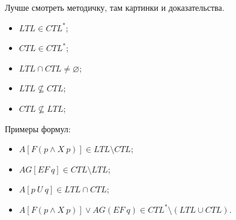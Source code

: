 \documentclass[a4paper,12pt]{article}
\begin{document}
Лучше смотреть методичку, там картинки и доказательства.
\begin{itemize}
    \item $LTL \in CTL^*$;
    \item $CTL \in CTL^*$;
    \item $LTL \cap CTL \ne \varnothing$;
    \item $LTL \nsubseteq CTL$;
    \item $CTL \nsubseteq LTL$;
\end{itemize}
Примеры формул:
\begin{itemize}
    \item $A[F(p \wedge X\ p)] \in LTL \setminus CTL$;
    \item $AG[EF\ q] \in CTL \setminus LTL$;
    \item $A[p\ U\ q] \in LTL \cap CTL$;
    \item $A[F(p \wedge X\ p)]\vee AG(EF\ q) \in CTL^* \setminus (LTL \cup CTL)$.
\end{itemize}
\end{document}
